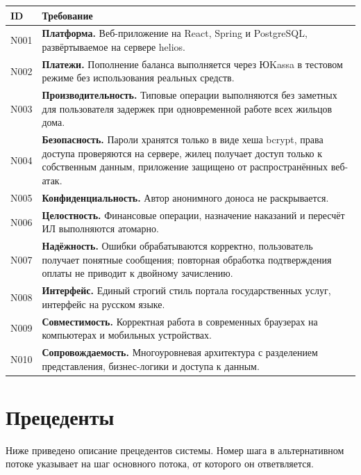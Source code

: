 \documentclass[12pt,a4paper]{article}
\newenvironment{reqtable}{%
  \begin{longtable}{L{14mm} L{146mm}}
  \toprule
  \textbf{ID} & \textbf{Требование} \\
  \midrule
  \endhead
  \bottomrule
  \endfoot
}{\end{longtable}}
\begin{document}
\begin{reqtable}
N001 & \textbf{Платформа.} Веб-приложение на React, Spring и PostgreSQL, развёртываемое на сервере helios. \\
N002 & \textbf{Платежи.} Пополнение баланса выполняется через ЮKassa в тестовом режиме без использования реальных средств. \\
N003 & \textbf{Производительность.} Типовые операции выполняются без заметных для пользователя задержек при одновременной работе всех жильцов дома. \\
N004 & \textbf{Безопасность.} Пароли хранятся только в виде хеша bcrypt, права доступа проверяются на сервере, жилец получает доступ только к собственным данным, приложение защищено от распространённых веб-атак. \\
N005 & \textbf{Конфиденциальность.} Автор анонимного доноса не раскрывается. \\
N006 & \textbf{Целостность.} Финансовые операции, назначение наказаний и пересчёт ИЛ выполняются атомарно. \\
N007 & \textbf{Надёжность.} Ошибки обрабатываются корректно, пользователь получает понятные сообщения; повторная обработка подтверждения оплаты не приводит к двойному зачислению. \\
N008 & \textbf{Интерфейс.} Единый строгий стиль портала государственных услуг, интерфейс на русском языке. \\
N009 & \textbf{Совместимость.} Корректная работа в современных браузерах на компьютерах и мобильных устройствах. \\
N010 & \textbf{Сопровождаемость.} Многоуровневая архитектура с разделением представления, бизнес-логики и доступа к данным. \\
\end{reqtable}

\section{Прецеденты}

Ниже приведено описание прецедентов системы. Номер шага в альтернативном
потоке указывает на шаг основного потока, от которого он ответвляется.
\end{document}
